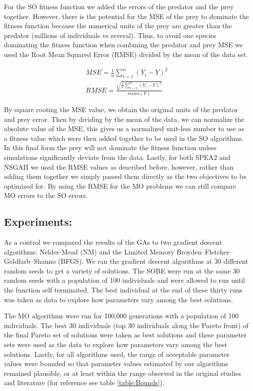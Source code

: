 \documentclass[twocolumn, 9pt]{article}
\begin{document}
\indent{} For the SO fitness function we added the errors of the predator and the prey together. However, there is the potential for the MSE of the prey to dominate the fitness function because the numerical units of the prey are greater than the predator (millions of individuals vs several). Thus, to avoid one species dominating the fitness function when combining the predator and prey MSE we used the Root Mean Squared Error (RMSE) divided by the mean of the data set.

\begin{align}
    MSE=\frac{1}{n}\sum_{i=1}^{n} (Y_i - Y)^2 \\
    RMSE=\frac{\sqrt{\frac{1}{n}\sum_{i=1}^{n} (Y_i - Y)^2}}{mean(Y)}
\end{align}

\indent{} By square rooting the MSE value, we obtain the original units of the predator and prey error. Then by dividing by the mean of the data, we can normalize the absolute value of the MSE, this gives us a normalized unit-less number to use as a fitness value which were then added together to be used in the SO algorithms. In this final form the prey will not dominate the fitness function unless simulations significantly deviate from the data. Lastly, for both SPEA2 and NSGAII we used the RMSE values as described before, however, rather than adding them together we simply passed them directly as the two objectives to be optimized for. By using the RMSE for the MO problems we can still compare MO errors to the SO errors.

\subsection{Experiments:}

\intdent{} As a control we compared the results of the GAs to two gradient descent algorithms: Nelder-Mead (NM) and the Limited Memory Broyden–Fletcher–Goldfarb–Shanno (BFGS). We ran the gradient descent algorithms at 30 different random seeds to get a variety of solutions. The SOBE were run at the same 30 random seeds with a population of 100 individuals and were allowed to run until the function self terminated. The best individual at the end of these thirty runs was taken as data to explore how parameters vary among the best solutions.

\indent{} The MO algorithms were run for 100,000 generations with a population of 100 individuals. The best 30 individuals (top 30 individuals along the Pareto front) of the final Pareto set of solutions were taken as best solutions and these parameter sets were used as the data to explore how parameters vary among the best solutions. Lastly, for all algorithms used, the range of acceptable parameter values were bounded so that parameter values estimated by our algorithms remained plausible, or at least within the range observed in the original studies and literature (for reference see table \ref{table:Bounds}). 
\end{document}
